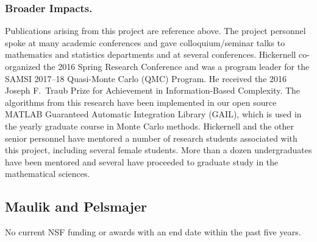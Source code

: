 \documentclass[11pt]{NSFamsart}
\begin{document}
\subsubsection*{Broader Impacts.}
Publications arising from this project are reference above.  
The project personnel spoke at many academic conferences and gave colloquium/seminar talks to mathematics and statistics departments and at several conferences.  Hickernell co-organized the 2016 Spring Research Conference and was a program leader for the SAMSI 2017--18 Quasi-Monte Carlo (QMC) Program.   He received the 2016 Joseph F.\ Traub Prize for Achievement in Information-Based Complexity. The algorithms from this research have been implemented in our open source MATLAB Guaranteed Automatic Integration Library (GAIL), which is used in the yearly graduate course in Monte Carlo methods.  Hickernell and the other senior personnel have mentored a number of research students associated with this project, including several female students.  More than a dozen undergraduates have been mentored and several have proceeded to graduate study in the mathematical sciences. 
 
\subsection*{Maulik and Pelsmajer} No current NSF funding or awards with an end date within the past five years. 

 




\newpage
{}
\renewcommand{\thepage} {\arabic{page}}


% 
%

\end{document}
